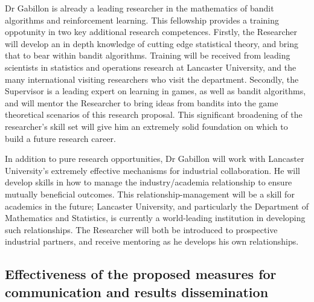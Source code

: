 \documentclass[a4paper,11pt]{article}
\begin{document}
Dr Gabillon is already a leading researcher in the mathematics of bandit algorithms and reinforcement learning.  This fellowship provides a training oppotunity in two key additional research competences.  Firstly, the Researcher will develop an in depth knowledge of cutting edge statistical theory, and bring that to bear within bandit algorithms.  Training will be received from leading scientists in statistics and operations research at Lancaster University, and the many international visiting researchers who visit the department.   Secondly, the Supervisor is a leading expert on learning in games, as well as bandit algorithms, and will mentor the Researcher to bring ideas from bandits into the game theoretical scenarios of this research proposal.  This significant broadening of the researcher's skill set will give him an extremely solid foundation on which to build a future research career.

In addition to pure research opportunities, Dr Gabillon will work with Lancaster University's extremely effective mechanisms for industrial collaboration.  He will develop skills in how to manage the industry/academia relationship to ensure mutually beneficial outcomes.  This relationship-management will be a skill for academics in the future; Lancaster University, and particularly the Department of Mathematics and Statistics, is currently a world-leading institution in developing such relationships.  The Researcher will both be introduced to prospective industrial partners, and receive mentoring as he develops his own relationships.


\subsection{Effectiveness of the proposed measures for communication and results dissemination}
\end{document}
